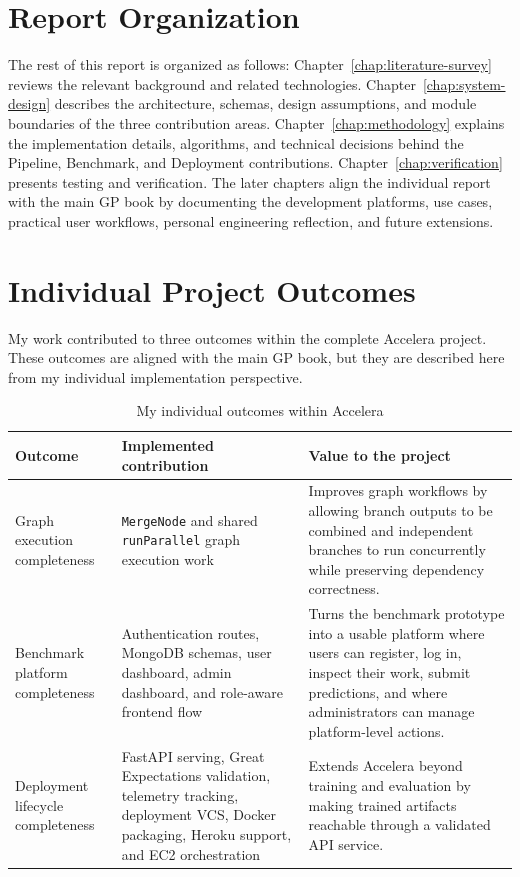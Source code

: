 \documentclass[12pt,a4paper,oneside]{report}
\newcommand{\systemname}{Accelera}
\newcommand{\modulepath}[1]{\texttt{#1}}
\begin{document}
\section{Report Organization}
The rest of this report is organized as follows: Chapter~\ref{chap:literature-survey} reviews the relevant background and related technologies. Chapter~\ref{chap:system-design} describes the architecture, schemas, design assumptions, and module boundaries of the three contribution areas. Chapter~\ref{chap:methodology} explains the implementation details, algorithms, and technical decisions behind the Pipeline, Benchmark, and Deployment contributions. Chapter~\ref{chap:verification} presents testing and verification. The later chapters align the individual report with the main GP book by documenting the development platforms, use cases, practical user workflows, personal engineering reflection, and future extensions.

\section{Individual Project Outcomes}
My work contributed to three outcomes within the complete \systemname{} project. These outcomes are aligned with the main GP book, but they are described here from my individual implementation perspective.

\begin{table}[H]
\centering
\small
\caption{My individual outcomes within \systemname{}}
\label{tab:individual-outcomes}
\begin{tabularx}{\textwidth}{p{}p{}X}
\toprule
\textbf{Outcome} & \textbf{Implemented contribution} & \textbf{Value to the project} \\
\midrule
Graph execution completeness &
\modulepath{MergeNode} and shared \modulepath{runParallel} graph execution work &
Improves graph workflows by allowing branch outputs to be combined and independent branches to run concurrently while preserving dependency correctness. \\
\midrule
Benchmark platform completeness &
Authentication routes, MongoDB schemas, user dashboard, admin dashboard, and role-aware frontend flow &
Turns the benchmark prototype into a usable platform where users can register, log in, inspect their work, submit predictions, and where administrators can manage platform-level actions. \\
\midrule
Deployment lifecycle completeness &
FastAPI serving, Great Expectations validation, telemetry tracking, deployment VCS, Docker packaging, Heroku support, and EC2 orchestration &
Extends \systemname{} beyond training and evaluation by making trained artifacts reachable through a validated API service. \\
\bottomrule
\end{tabularx}
\end{table}
\end{document}
